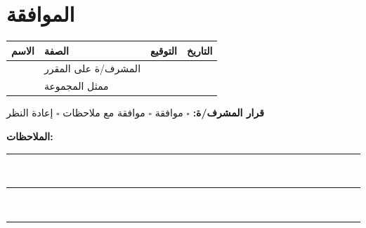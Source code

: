 \documentclass[12pt,a4paper]{article}
\begin{document}
\section{الموافقة}
\begin{tabularx}{\textwidth}{|Y|p{2.5cm}|p{2.5cm}|p{2.5cm}|}
\hline
\textbf{الاسم} & \textbf{الصفة} & \textbf{التوقيع} & \textbf{التاريخ}\\ \hline
 & المشرف/ة على المقرر & & \\[0.7cm] \hline
 & ممثل المجموعة & & \\[0.7cm] \hline
\end{tabularx}

\vspace{0.5cm}
\textbf{قرار المشرف/ة:} \quad $\square$ موافقة \quad $\square$ موافقة مع ملاحظات \quad $\square$ إعادة النظر

\vspace{0.5cm}
\textbf{الملاحظات:}

\rule{\textwidth}{0.4pt}\\[0.7cm]
\rule{\textwidth}{0.4pt}\\[0.7cm]
\rule{\textwidth}{0.4pt}
\end{document}
